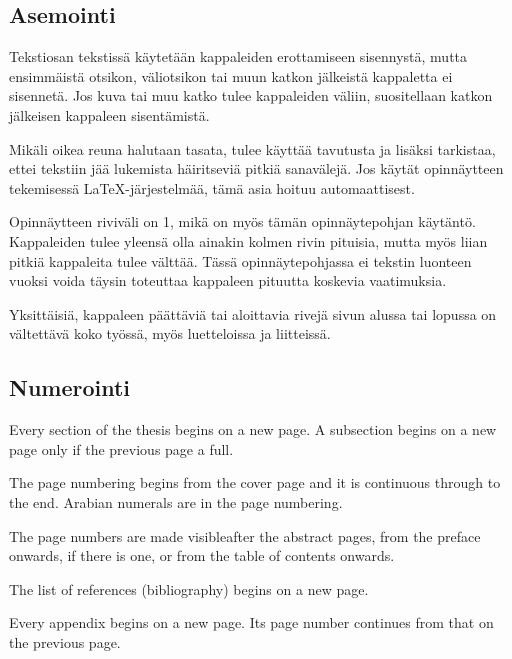 \documentclass[english, 12pt, a4paper, elec, utf8, a-1b, online]{aaltothesis}
\begin{document}
\subsection*{Asemointi}

Tekstiosan tekstiss\"a k\"aytet\"a\"an kappaleiden erottamiseen sisennyst\"a,
mutta ensimm\"aist\"a otsikon, v\"aliotsikon tai muun katkon j\"alkeist\"a
kappaletta ei sisennet\"a. Jos kuva tai muu katko tulee kappaleiden
v\"aliin, suositellaan katkon j\"alkeisen kappaleen sisent\"amist\"a.

Mik\"ali oikea reuna halutaan tasata, tulee k\"aytt\"a\"a tavutusta ja lis\"aksi
tarkistaa, ettei tekstiin j\"a\"a lukemista h\"airitsevi\"a pitki\"a sanav\"alej\"a. Jos
k\"ayt\"at opinn\"aytteen tekemisess\"a \LaTeX-j\"arjestelm\"a\"a, 
t\"am\"a asia hoituu automaattisest.

Opinn\"aytteen riviv\"ali on 1, mik\"a on my\"os t\"am\"an opinn\"aytepohjan k\"ayt\"ant\"o. 
Kappaleiden tulee yleens\"a olla ainakin kolmen rivin pituisia, mutta
my\"os liian pitki\"a kappaleita tulee v\"altt\"a\"a.  T\"ass\"a opinn\"aytepohjassa
ei tekstin luonteen vuoksi voida t\"aysin toteuttaa kappaleen pituutta koskevia
vaatimuksia.

Yksitt\"aisi\"a, kappaleen p\"a\"att\"avi\"a tai aloittavia rivej\"a sivun alussa
tai lopussa on v\"altett\"av\"a koko ty\"oss\"a, my\"os luetteloissa ja
liitteiss\"a.

\subsection*{Numerointi}

Every section of the thesis begins on a new page. A subsection begins on a new 
page only if the previous page a full.

The page numbering begins from the cover page and it is continuous through to 
the end. Arabian numerals are in the page numbering.

The page numbers are made visibleafter the abstract pages, from the preface 
onwards, if there is one, or from the table of contents onwards.

The list of references (bibliography) begins on a new page.

Every appendix begins on a new page. Its page number continues from that on the
previous page.
\end{document}

